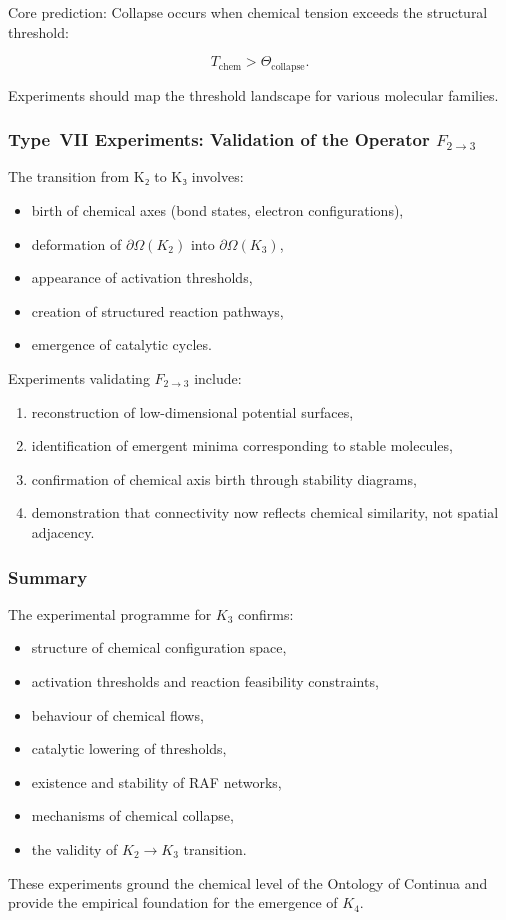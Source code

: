 Core prediction:  
Collapse occurs when chemical tension exceeds the structural threshold:

\[
    T_{\mathrm{chem}} > \Theta_{\mathrm{collapse}}.
\]

Experiments should map the threshold landscape for various molecular families.



\subsubsection{Type~VII Experiments: Validation of the Operator $F_{2\rightarrow 3}$}

The transition from K₂ to K₃ involves:

\begin{itemize}
    \item birth of chemical axes (bond states, electron configurations),
    \item deformation of $\partial\Omega(K_2)$ into $\partial\Omega(K_3)$,
    \item appearance of activation thresholds,
    \item creation of structured reaction pathways,
    \item emergence of catalytic cycles.
\end{itemize}

Experiments validating $F_{2\rightarrow 3}$ include:

\begin{enumerate}
    \item reconstruction of low-dimensional potential surfaces,
    \item identification of emergent minima corresponding to stable molecules,
    \item confirmation of chemical axis birth through stability diagrams,
    \item demonstration that connectivity now reflects chemical similarity, 
          not spatial adjacency.
\end{enumerate}



\subsubsection{Summary}

The experimental programme for $K_3$ confirms:

\begin{itemize}
    \item structure of chemical configuration space,
    \item activation thresholds and reaction feasibility constraints,
    \item behaviour of chemical flows,
    \item catalytic lowering of thresholds,
    \item existence and stability of RAF networks,
    \item mechanisms of chemical collapse,
    \item the validity of $K_2 \rightarrow K_3$ transition.
\end{itemize}

These experiments ground the chemical level of the Ontology of Continua and 
provide the empirical foundation for the emergence of $K_4$.
